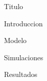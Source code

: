 \documentclass[12pt]{article}
\begin{document}

    {Titulo}

    \frontmatter


    \renewcommand*\contentsname{Índice}
    \tableofcontents

    \mainmatter

    {Introduccion}
    \newpage

    {Modelo}
    \newpage

    {Simulaciones}
    \newpage

    {Resultados}
    \newpage

    \newpage
    \printbibliography[heading = bibintoc, title = Referencias]    %

\end{document}
